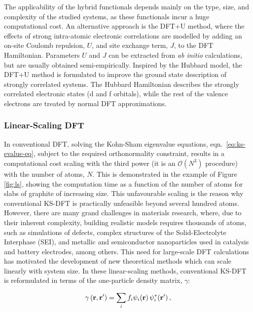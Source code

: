 \documentclass[../main.tex]{subfiles}
\begin{document}
The applicability of the hybrid functionals depends mainly on the type, size, and complexity of the studied systems, as these functionals incur a huge computational cost. An alternative approach is the DFT+U method, where the effects of strong intra-atomic electronic correlations are modelled by adding an on-site Coulomb repulsion, $U$, and site exchange term, $J$, to the DFT Hamiltonian. \cite{DFT-U-1,DFT-U-2,DFT-U-3} Parameters $U$ and $J$ can be extracted from \textit{ab initio} calculations, but are usually obtained semi-empirically. Inspired by the Hubbard model, the DFT+U method is formulated to improve the ground state description of strongly correlated systems. The Hubbard Hamiltonian describes the strongly correlated electronic states (d and f orbitals), while the rest of the valence electrons are treated by normal DFT approximations. 

\subsubsection{Linear-Scaling DFT}
\label{sec:lsdft}
In conventional DFT, solving the Kohn-Sham eigenvalue equations, eqn.~\ref{eq:ks-evalue-eq}, subject to the required orthonormality constraint, results in a computational cost scaling with the third power (it is an $\mathcal{O}(N^3)$ procedure) with the number of atoms, $N$. This is demonstrated in the example of Figure \ref{fig:ls}, showing the computation time as a function of the number of atoms for slabs of graphite of increasing size. This unfavourable scaling is the reason why conventional KS-DFT is practically unfeasible beyond several hundred atoms. However, there are many grand challenges in materials research, where, due to their inherent complexity, building realistic models requires thousands of atoms, such as simulations of defects, complex structures of the Solid-Electrolyte Interphase (SEI), and metallic and semiconductor nanoparticles used in catalysis and battery electrodes, among others. This need for large-scale DFT calculations has motivated the development of new theoretical methods which can scale linearly with system size.\cite{Goedecker1999} In these linear-scaling methods, conventional KS-DFT is reformulated in terms of the one-particle density matrix, $\gamma$:

\begin{equation}
    \gamma\left(\mathbf{r},\mathbf{r'}\right)=\sum\limits_i f_i \psi_i\!\left(\mathbf{r}\right)\psi_i^*\!\left(\mathbf{r'}\right), \label{eq:density-matrix-mos}
\end{equation}
\end{document}

